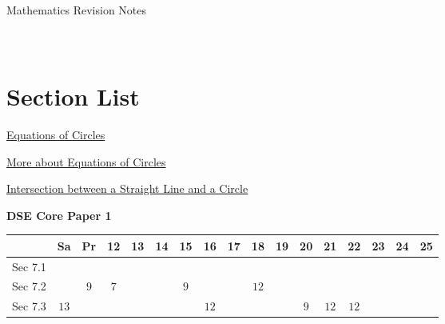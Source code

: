 \documentclass[12pt, a4paper]{article}
\begin{document}
\newpage
\newpage
\thispagestyle{empty}
\begin{center}
Mathematics Revision Notes\\\vspace{1cm}
\\\vspace{1cm}
{\fontsize{24pt}{24pt}\selectfont {Equations of Circles}} \\\vspace{1cm}
\label{chapter:S5-7}

\end{center}
\vspace{0.5cm}
\hline
\section*{Section List}
\begin{enumx}[label=Sec 7.\arabic*\ ]
\item \hyperref[section:5-7-1]{Equations of Circles}
\item \hyperref[section:5-7-2]{More about Equations of Circles}
\item \hyperref[section:5-7-3]{Intersection between a  Straight Line and a Circle \NF}
\end{enumx}
\begin{absolutelynopagebreak}
\begin{center}
\textbf{DSE Core Paper 1}
\end{center}
\begin{center}
\begin{tabular}{|l|c|c|c|c|c|c|c|c|c|c|c|c|c|c|c|c|}
\hline
        & Sa & Pr & 12 & 13 & 14 & 15 & 16 & 17 & 18 & 19 & 20 & 21 & 22 & 23 & 24 & 25 \\\hline\hline
Sec 7.1 &  &  &  &  &  &  &  &  &  &  &  &  &  &  &  &  \\\hline
Sec 7.2 &  &  $9$ &  $7$ &  &  &  $9$ &  &  &  $12$ &  &  &  &  &  &  &  \\\hline
Sec 7.3 &  $13$ &  &  &  &  &  &  $12$ &  &  &  &  $9$ &  $12$ &  $12$ &  &  &  \\\hline
\end{tabular}
\end{center}
\end{absolutelynopagebreak}
\end{document}
